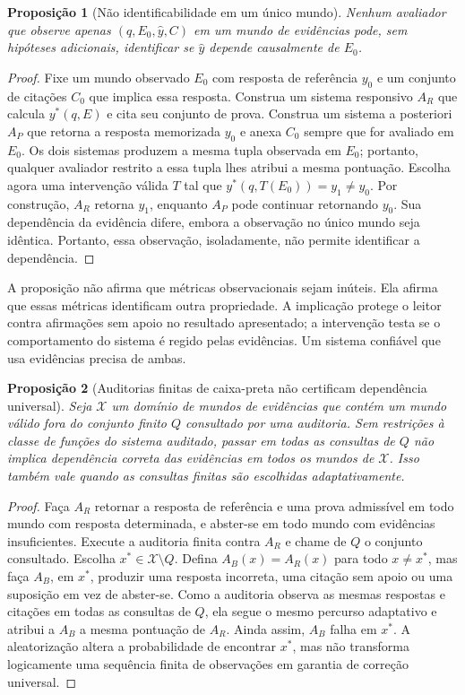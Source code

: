 \documentclass[10pt,twocolumn]{article}
\newtheorem{proposition}{Proposição}
\begin{document}
\begin{proposition}[Não identificabilidade em um único mundo]
Nenhum avaliador que observe apenas $(q,E_0,\hat y,C)$ em um mundo de evidências pode, sem hipóteses adicionais, identificar se $\hat y$ depende causalmente de $E_0$.
\end{proposition}

\begin{proof}
Fixe um mundo observado $E_0$ com resposta de referência $y_0$ e um conjunto de citações $C_0$ que implica essa resposta. Construa um sistema responsivo $A_R$ que calcula $y^*(q,E)$ e cita seu conjunto de prova. Construa um sistema a posteriori $A_P$ que retorna a resposta memorizada $y_0$ e anexa $C_0$ sempre que for avaliado em $E_0$. Os dois sistemas produzem a mesma tupla observada em $E_0$; portanto, qualquer avaliador restrito a essa tupla lhes atribui a mesma pontuação. Escolha agora uma intervenção válida $T$ tal que $y^*(q,T(E_0))=y_1\neq y_0$. Por construção, $A_R$ retorna $y_1$, enquanto $A_P$ pode continuar retornando $y_0$. Sua dependência da evidência difere, embora a observação no único mundo seja idêntica. Portanto, essa observação, isoladamente, não permite identificar a dependência.
\end{proof}

A proposição não afirma que métricas observacionais sejam inúteis. Ela afirma que essas métricas identificam outra propriedade. A implicação protege o leitor contra afirmações sem apoio no resultado apresentado; a intervenção testa se o comportamento do sistema é regido pelas evidências. Um sistema confiável que usa evidências precisa de ambas.

\begin{proposition}[Auditorias finitas de caixa-preta não certificam dependência universal]
\label{prop:finite}
Seja $\mathcal{X}$ um domínio de mundos de evidências que contém um mundo válido fora do conjunto finito $Q$ consultado por uma auditoria. Sem restrições à classe de funções do sistema auditado, passar em todas as consultas de $Q$ não implica dependência correta das evidências em todos os mundos de $\mathcal{X}$. Isso também vale quando as consultas finitas são escolhidas adaptativamente.
\end{proposition}

\begin{proof}
Faça $A_R$ retornar a resposta de referência e uma prova admissível em todo mundo com resposta determinada, e abster-se em todo mundo com evidências insuficientes. Execute a auditoria finita contra $A_R$ e chame de $Q$ o conjunto consultado. Escolha $x^*\in\mathcal{X}\setminus Q$. Defina $A_B(x)=A_R(x)$ para todo $x\neq x^*$, mas faça $A_B$, em $x^*$, produzir uma resposta incorreta, uma citação sem apoio ou uma suposição em vez de abster-se. Como a auditoria observa as mesmas respostas e citações em todas as consultas de $Q$, ela segue o mesmo percurso adaptativo e atribui a $A_B$ a mesma pontuação de $A_R$. Ainda assim, $A_B$ falha em $x^*$. A aleatorização altera a probabilidade de encontrar $x^*$, mas não transforma logicamente uma sequência finita de observações em garantia de correção universal.
\end{proof}
\end{document}
